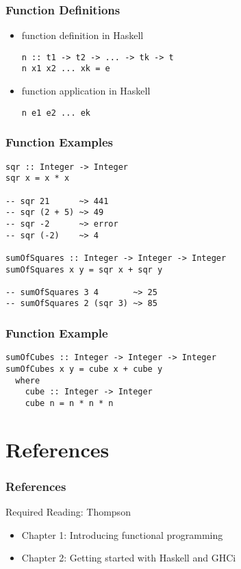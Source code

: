 \documentclass[dvipsnames]{beamer}
\theoremstyle{plain}
\begin{document}
\begin{frame}[fragile]
  \frametitle{Function Definitions}

  \begin{itemize}
    \item function definition in Haskell
    \begin{lstlisting}[style=syntax]
n :: t1 -> t2 -> ... -> tk -> t
n x1 x2 ... xk = e
    \end{lstlisting}

    \pause
    \bigskip
    \item function application in Haskell
    \begin{lstlisting}[style=syntax]
n e1 e2 ... ek
    \end{lstlisting}
  \end{itemize}
\end{frame}

\begin{frame}[fragile]
  \frametitle{Function Examples}

  \begin{lstlisting}
sqr :: Integer -> Integer
sqr x = x * x

-- sqr 21      ~> 441
-- sqr (2 + 5) ~> 49
-- sqr -2      ~> error
-- sqr (-2)    ~> 4

sumOfSquares :: Integer -> Integer -> Integer
sumOfSquares x y = sqr x + sqr y

-- sumOfSquares 3 4       ~> 25
-- sumOfSquares 2 (sqr 3) ~> 85
  \end{lstlisting}
\end{frame}

\begin{frame}[fragile]
  \frametitle{Function Example}

  \begin{lstlisting}
sumOfCubes :: Integer -> Integer -> Integer
sumOfCubes x y = cube x + cube y
  where
    cube :: Integer -> Integer
    cube n = n * n * n
  \end{lstlisting}
\end{frame}

\section*{References}

\begin{frame}
  \frametitle{References}

  \begin{block}{Required Reading: Thompson}
    \begin{itemize}
      \item Chapter 1: \alert{Introducing functional programming}
      \item Chapter 2: \alert{Getting started with Haskell and GHCi}
    \end{itemize}
  \end{block}
\end{frame}
\end{document}
